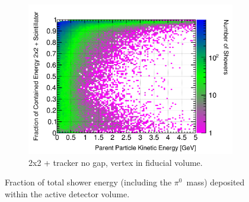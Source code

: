\documentclass[10pt,a4paper,openany]{article}
\begin{document}
\begin{figure}[htbp]
\begin{subfigure}[b]{0.49\textwidth}
		\includegraphics[width=1.0\textwidth]{Pi0_contained_frac_2x2_Scintillator_fiducial.png}
		\caption{2x2 + tracker no gap, vertex in fiducial volume.}
		\label{}
	\end{subfigure}	
  \caption{Fraction of total shower energy (including the $\pi^{0}$~mass) deposited within the active detector volume.}
\end{figure}
\end{document}

